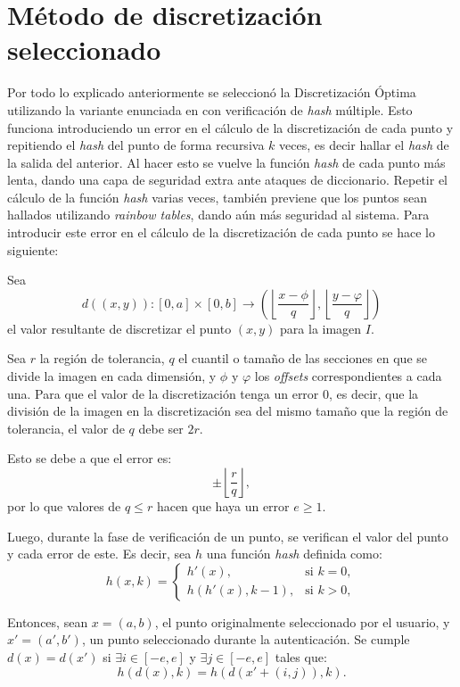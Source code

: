 \section{Método de discretización seleccionado}
Por todo lo explicado anteriormente se seleccion\'o la Discretizaci\'on \'Optima utilizando la variante enunciada en \cite{bicakci2008optimal} con verificaci\'on de \textit{hash} m\'ultiple. Esto funciona introduciendo un error en el c\'alculo de la discretizaci\'on de cada punto y repitiendo el \textit{hash} del punto de forma recursiva $k$ veces, es decir hallar el \textit{hash} de la salida del anterior. Al hacer esto se vuelve la funci\'on \textit{hash} de cada punto m\'as lenta, dando una capa de seguridad extra ante ataques de diccionario. Repetir el c\'alculo de la funci\'on \textit{hash} varias veces, tambi\'en previene que los puntos sean hallados utilizando \textit{rainbow tables}, dando a\'un m\'as seguridad al sistema.
Para introducir este error en el c\'alculo de la discretizaci\'on de cada punto se hace lo siguiente:

Sea 
\[
d((x,y)) : [0,a] \times [0,b] \to \left(\left\lfloor \frac{ x - \phi }{q} \right\rfloor, \left\lfloor \frac{ y - \varphi }{q} \right\rfloor\right)
\]
el valor resultante de discretizar el punto \((x,y)\) para la imagen \(I\). 

Sea \(r\) la región de tolerancia, \(q\) el cuantil o tamaño de las secciones en que se divide la imagen en cada dimensión, y \(\phi\) y \(\varphi\) los \textit{offsets} correspondientes a cada una. Para que el valor de la discretización tenga un error \(0\), es decir, que la división de la imagen en la discretización sea del mismo tamaño que la región de tolerancia, el valor de \(q\) debe ser \(2r\). 

Esto se debe a que el error es:
\[
\pm \left\lfloor \frac{r}{q} \right\rfloor,
\]
por lo que valores de \(q \leq r\) hacen que haya un error \(e \geq 1\).

Luego, durante la fase de verificación de un punto, se verifican el valor del punto y cada error de este. Es decir, sea \(h\) una función \textit{hash} definida como:
\[
h(x, k) = 
\begin{cases} 
	h'(x), & \text{si } k = 0, \\
	h(h'(x), k-1), & \text{si } k > 0,
\end{cases}
\]


Entonces, sean \(x = (a,b)\), el punto originalmente seleccionado por el usuario, y \(x' = (a',b')\), un punto seleccionado durante la autenticación. Se cumple \(d(x) = d(x')\) si \(\exists i \in [-e, e]\) y \(\exists j \in [-e, e]\) tales que:
\[
h(d(x), k) = h(d(x' + (i, j)), k).
\]

